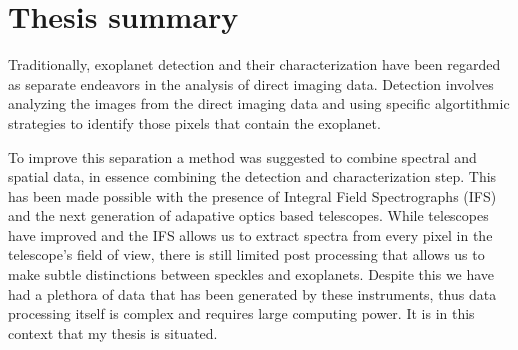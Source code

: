 \chapter*{Thesis summary}
Traditionally, exoplanet detection and their characterization have been regarded as separate endeavors in the analysis of direct imaging data. 
Detection involves analyzing the images from the direct imaging data and using specific algortithmic strategies to identify those pixels that contain the exoplanet.

To improve this separation a method was suggested to combine spectral and spatial data, in essence combining the detection 
and characterization step.
This has been made possible with the presence of Integral Field Spectrographs (IFS) and the next generation of adapative optics based 
telescopes.
While telescopes have improved and the IFS allows us to extract spectra from every pixel in the telescope's field of view, there is still 
limited post processing that allows us to make subtle distinctions between speckles and exoplanets.
Despite this we have had a plethora of data that has been generated by these instruments, thus data processing itself is complex and requires 
large computing power.
It is in this context that my thesis is situated.


